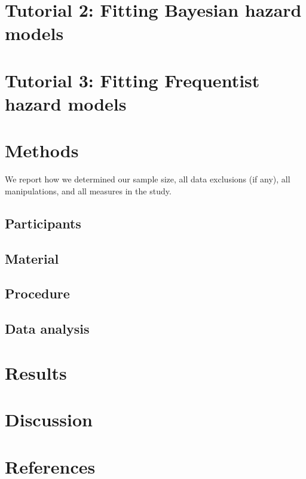 \documentclass[
  man,floatsintext]{apa6}
\begin{document}
\section{Tutorial 2: Fitting Bayesian hazard models}\label{tutorial-2-fitting-bayesian-hazard-models}

\section{Tutorial 3: Fitting Frequentist hazard models}\label{tutorial-3-fitting-frequentist-hazard-models}

\section{Methods}\label{methods}

We report how we determined our sample size, all data exclusions (if any), all manipulations, and all measures in the study.

\subsection{Participants}\label{participants}

\subsection{Material}\label{material}

\subsection{Procedure}\label{procedure}

\subsection{Data analysis}\label{data-analysis}

\section{Results}\label{results}

\section{Discussion}\label{discussion}

\newpage

\section{References}\label{references}
\end{document}
